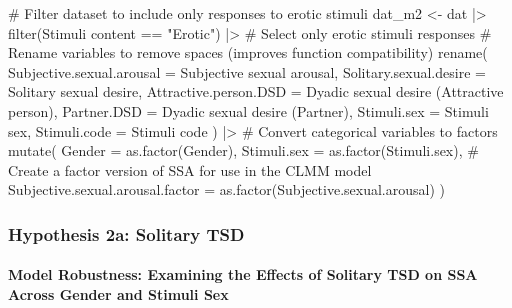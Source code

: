 \documentclass[
  bookmarksnumbered]{article}
\newenvironment{Shaded}{\begin{snugshade}}{\end{snugshade}}
\newcommand{\AttributeTok}[1]{\textcolor[rgb]{0.80,0.80,0.80}{#1}}
\newcommand{\CommentTok}[1]{\textcolor[rgb]{0.50,0.62,0.50}{#1}}
\newcommand{\FunctionTok}[1]{\textcolor[rgb]{0.94,0.94,0.56}{#1}}
\newcommand{\NormalTok}[1]{\textcolor[rgb]{0.80,0.80,0.80}{#1}}
\newcommand{\OtherTok}[1]{\textcolor[rgb]{0.94,0.94,0.56}{#1}}
\newcommand{\SpecialCharTok}[1]{\textcolor[rgb]{0.86,0.64,0.64}{#1}}
\newcommand{\StringTok}[1]{\textcolor[rgb]{0.80,0.58,0.58}{#1}}
\begin{document}
\begin{Shaded}
\begin{Highlighting}[]
\CommentTok{\# Filter dataset to include only responses to erotic stimuli}
\NormalTok{dat\_m2 }\OtherTok{\textless{}{-}}\NormalTok{ dat }\SpecialCharTok{|\textgreater{}}
  \FunctionTok{filter}\NormalTok{(}\StringTok{\textasciigrave{}}\AttributeTok{Stimuli content}\StringTok{\textasciigrave{}} \SpecialCharTok{==} \StringTok{"Erotic"}\NormalTok{) }\SpecialCharTok{|\textgreater{}} \CommentTok{\# Select only erotic stimuli responses}
  \CommentTok{\# Rename variables to remove spaces (improves function compatibility)}
  \FunctionTok{rename}\NormalTok{(}
    \AttributeTok{Subjective.sexual.arousal =} \StringTok{\textasciigrave{}}\AttributeTok{Subjective sexual arousal}\StringTok{\textasciigrave{}}\NormalTok{,}
    \AttributeTok{Solitary.sexual.desire =} \StringTok{\textasciigrave{}}\AttributeTok{Solitary sexual desire}\StringTok{\textasciigrave{}}\NormalTok{,}
    \AttributeTok{Attractive.person.DSD =} \StringTok{\textasciigrave{}}\AttributeTok{Dyadic sexual desire (Attractive person)}\StringTok{\textasciigrave{}}\NormalTok{,}
    \AttributeTok{Partner.DSD =} \StringTok{\textasciigrave{}}\AttributeTok{Dyadic sexual desire (Partner)}\StringTok{\textasciigrave{}}\NormalTok{,}
    \AttributeTok{Stimuli.sex =} \StringTok{\textasciigrave{}}\AttributeTok{Stimuli sex}\StringTok{\textasciigrave{}}\NormalTok{,}
    \AttributeTok{Stimuli.code =} \StringTok{\textasciigrave{}}\AttributeTok{Stimuli code}\StringTok{\textasciigrave{}}
\NormalTok{  ) }\SpecialCharTok{|\textgreater{}}
  \CommentTok{\# Convert categorical variables to factors}
  \FunctionTok{mutate}\NormalTok{(}
    \AttributeTok{Gender =} \FunctionTok{as.factor}\NormalTok{(Gender),}
    \AttributeTok{Stimuli.sex =} \FunctionTok{as.factor}\NormalTok{(Stimuli.sex),}
    \CommentTok{\# Create a factor version of SSA for use in the CLMM model}
    \AttributeTok{Subjective.sexual.arousal.factor =} \FunctionTok{as.factor}\NormalTok{(Subjective.sexual.arousal)}
\NormalTok{  )}
\end{Highlighting}
\end{Shaded}

\subsubsection{Hypothesis 2a: Solitary TSD}\label{hyp2a}

\paragraph{Model Robustness: Examining the Effects of Solitary TSD on SSA Across Gender and Stimuli Sex}\label{model-robustness-examining-the-effects-of-solitary-tsd-on-ssa-across-gender-and-stimuli-sex}
\end{document}
